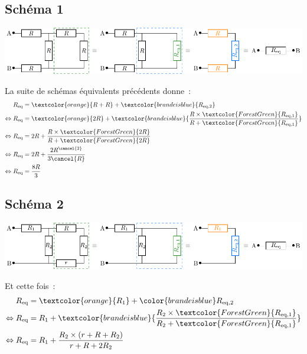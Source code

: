 \documentclass[../../main/main.tex]{subfiles}
\begin{document}
{\subsection{Schéma 1}
\begin{center}
    \includegraphics{requiv_a}
\end{center}
La suite de schémas équivalents précédents donne~:
\begin{align*}
    R_{\rm eq}                 & = \textcolor{orange}{R + R} +
        \textcolor{brandeisblue}{R_{\rm eq,2}} \\
    \Leftrightarrow R_{\rm eq} & = \textcolor{orange}{2R} +
        \textcolor{brandeisblue}{\frac{
                R\times \textcolor{ForestGreen}{R_{\rm eq,1}}
        }{R + \textcolor{ForestGreen}{R_{\rm eq,1}}}}\\
    \Leftrightarrow R_{\rm eq} & = 2R + \frac{
        R\times\textcolor{ForestGreen}{2R}}{
        R+\textcolor{ForestGreen}{2R}} \\
    \Leftrightarrow R_{\rm eq} & = 2R + \frac{2R^{\cancel{2}}}{3\cancel{R}}\\
    \Leftrightarrow R_{\rm eq} & = \frac{8R}{3}
\end{align*}

\subsection{Schéma 2}
\begin{center}
    \includegraphics{requiv_b}
\end{center}
Et cette fois~:
\begin{align*}
    R_{\rm eq}                 & =
    \textcolor{orange}{R_1} + \color{brandeisblue}R_{\rm eq,2} \\
    \Leftrightarrow R_{\rm eq} & =
        R_1 + \textcolor{brandeisblue}{\frac{
        R_2\times \textcolor{ForestGreen}{R_{\rm eq,1}}}{
        R_2 + \textcolor{ForestGreen}{R_{\rm eq,1}}}} \\
    \Leftrightarrow R_{\rm eq} & =
        R_1 + \frac{R_2\times(r+R+R_2)}{r+R+2R_2}\\
\end{align*}

}
\end{document}
